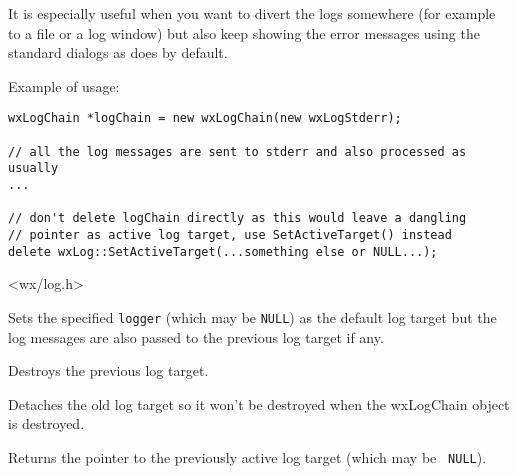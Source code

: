 It is especially useful when you want to divert the logs somewhere (for
example to a file or a log window) but also keep showing the error messages
using the standard dialogs as  does by default.

Example of usage:

\begin{verbatim}
wxLogChain *logChain = new wxLogChain(new wxLogStderr);

// all the log messages are sent to stderr and also processed as usually
...

// don't delete logChain directly as this would leave a dangling
// pointer as active log target, use SetActiveTarget() instead
delete wxLog::SetActiveTarget(...something else or NULL...);

\end{verbatim}




<wx/log.h>


\label{wxlogchainctor}


Sets the specified {\tt logger} (which may be {\tt NULL}) as the default log
target but the log messages are also passed to the previous log target if any.

\label{wxlogchaindtor}


Destroys the previous log target.

\label{wxlogchaindetacholdlog}


Detaches the old log target so it won't be destroyed when the wxLogChain object
is destroyed.

\label{wxlogchaingetoldlog}


Returns the pointer to the previously active log target (which may be {\tt
NULL}).

\label{wxlogchainispassingmessages}

